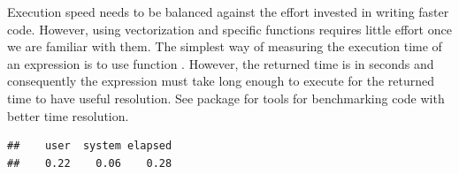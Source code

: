 \documentclass[krantz2]{krantz}\usepackage{knitr}
\begin{document}
Execution speed needs to be balanced against the effort invested in writing faster code. However, using vectorization and specific \Rlang functions requires little effort once we are familiar with them. The simplest way of measuring the execution time of an \Rlang expression is to use function . However, the returned time is in seconds and consequently the expression must take long enough to execute for the returned time to have useful resolution. See package  for tools for benchmarking code with better time resolution.

\begin{knitrout}\footnotesize
{}\color{fgcolor}\begin{kframe}
\begin{alltt}
 \hlkwb{<-} \hlstd{()}
               \hlopt{:}\hlstd{) \{}
               \hlkwb{<-}  \hlopt{/} 
              \hlstd{\}}
            \hlstd{\})}
\end{alltt}
\begin{verbatim}
##    user  system elapsed 
##    0.22    0.06    0.28
\end{verbatim}
\end{kframe}
\end{knitrout}
\end{document}
